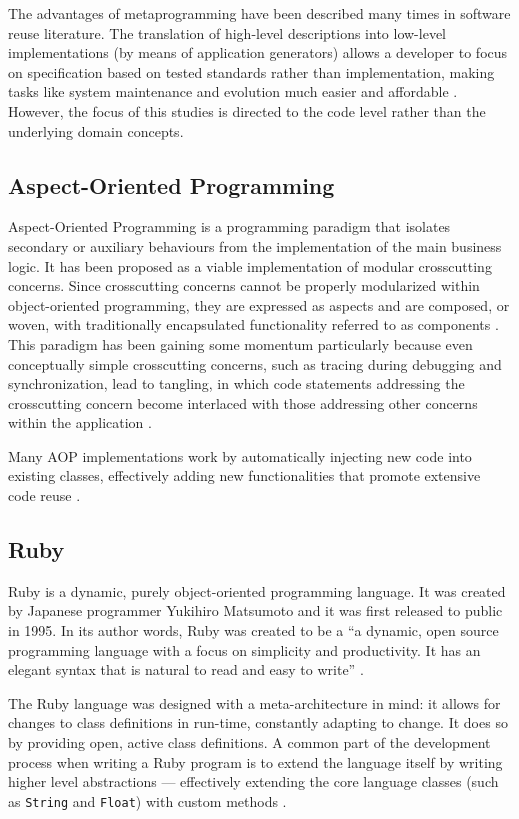 The advantages of metaprogramming have been described many times in software reuse literature. The translation of high-level descriptions into low-level implementations (by means of application generators) allows a developer to focus on specification based on tested standards rather than implementation, making tasks like system maintenance and evolution much easier and affordable \cite{Bas87, Cle88}. However, the focus of this studies is directed to the code level rather than the underlying domain concepts.

\subsection{Aspect-Oriented Programming}\label{sec:aspect_oriented_programming}

Aspect-Oriented Programming is a programming paradigm that isolates secondary or auxiliary behaviours from the implementation of the main business logic. It has been proposed as a viable implementation of modular crosscutting concerns. Since crosscutting concerns cannot be properly modularized within object-oriented programming, they are expressed as aspects and are composed, or woven, with traditionally encapsulated functionality referred to as components \cite{KM05, Ste06}. This paradigm has been gaining some momentum particularly because even conceptually simple crosscutting concerns, such as tracing during debugging and synchronization, lead to tangling, in which code statements addressing the crosscutting concern become interlaced with those addressing other concerns within the application \cite{LC03}.

Many AOP implementations work by automatically injecting new code into existing classes, effectively adding new functionalities that promote extensive code reuse \cite{Ste06, LC03}.

\subsection{Ruby}\label{sec:ruby}

Ruby is a dynamic, purely object-oriented programming language. It was created by Japanese programmer Yukihiro Matsumoto and it was first released to public in 1995. In its author words, Ruby was created to be a ``a dynamic, open source programming language with a focus on simplicity and productivity. It has an elegant syntax that is natural to read and easy to write'' \cite{ruby}.

The Ruby language was designed with a meta-architecture in mind: it allows for changes to class definitions in run-time, constantly adapting to change. It does so by providing open, active class definitions. A common part of the development process when writing a Ruby program is to extend the language itself by writing higher level abstractions --- effectively extending the core language classes (such as \verb!String! and \verb!Float!) with custom methods \cite{metaprogramming_ruby}.

